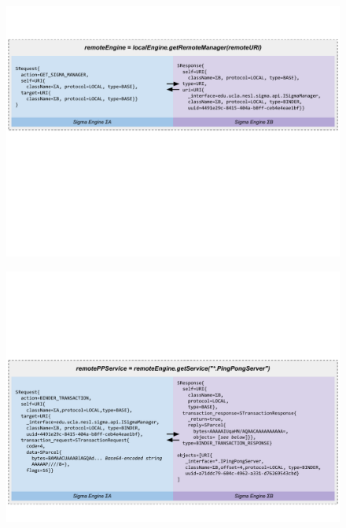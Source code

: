 \documentclass[prodmode]{acmlarge}
\begin{document}
\begin{figure}[t!]
\centering
\includegraphics[width=\textwidth]{drawings/WireExchange1.pdf}
\end{figure}


\begin{figure}[t!]
\centering
\includegraphics[width=\textwidth]{drawings/WireExchange2.pdf}
\end{figure}



\end{document}
